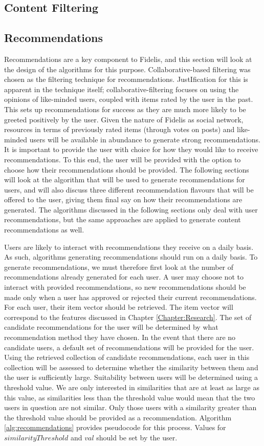 \subsection{Content Filtering}
\subsection{Recommendations}
Recommendations are a key component to Fidelis, and this section will look at the design of the algorithms for this purpose. Collaborative-based filtering was chosen as the filtering technique for recommendations. JustIfication for this is apparent in the technique itself; collaborative-filtering focuses on using the opinions of like-minded users, coupled with items rated by the user in the past. This sets up recommendations for success as they are much more likely to be greeted positively by the user. Given the nature of Fidelis as social network, resources in terms of previously rated items (through votes on posts) and like-minded users will be available in abundance to generate strong recommendations. It is important to provide the user with choice for how they would like to receive recommendations. To this end, the user will be provided with the option to choose how their recommendations should be provided. The following sections will look at the algorithm that will be used to generate recommendations for users, and will also discuss three different recommendation flavours that will be offered to the user, giving them final say on how their recommendations are generated. The algorithms discussed in the following sections only deal with user recommendations, but the same approaches are applied to generate content recommendations as well.

Users are likely to interact with recommendations they receive on a daily basis. As such, algorithms generating recommendations should run on a daily basis. To generate recommendations, we must therefore first look at the number of recommendations already generated for each user. A user may choose not to interact with provided recommendations, so new recommendations should be made only when a user has approved or rejected their current recommendations. For each user, their item vector should be retrieved. The item vector will correspond to the features discussed in Chapter \ref{Chapter:Research}. The set of candidate recommendations for the user will be determined by what recommendation method they have chosen. In the event that there are no candidate users, a default set of recommendations will be provided for the user. Using the retrieved collection of candidate recommendations, each user in this collection will be assessed to determine whether the similarity between them and the user is sufficiently large. Suitability between users will be determined using a threshold value. We are only interested in similarities that are at least as large as this value, as similarities less than the threshold value would mean that the two users in question are not similar. Only those users with a similarity greater than the threshold value should be provided as a recommendation. Algorithm \ref{alg:recommendations} provides pseudocode for this process. Values for $similarityThreshold$ and $val$ should be set by the user.

